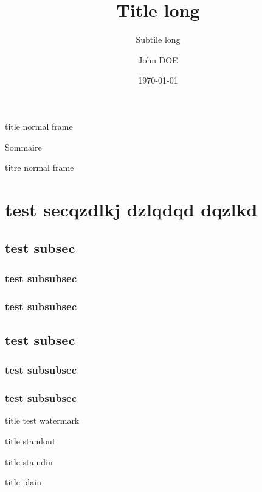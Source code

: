 \documentclass[notheorems, noamsthm, aspectratio=169, 10pt]{beamer}
\title[shorttitle]{Title long}
\subtitle[shortsubtitle]{Subtile long}
\date[shortdate]{\today}
\author[john.doe@mail.com]{John DOE\inst{1}}
\institute[shortinstitute]{\inst{1} An Awesome Company}
\begin{document}

\begin{frame}
   \titlepage
\end{frame}

\begin{frame}{title}
   normal frame
\end{frame}

{  
   \begin{frame}[toc]{Sommaire}
		\tableofcontents
	\end{frame}


	\begin{frame}{titre}
		normal frame
	\end{frame}
} 

\section{test secqzdlkj dzlqdqd dqzlkd} 
\subsection{test subsec}
\subsubsection{test subsubsec}
\subsubsection{test subsubsec}

\subsection{test subsec}
\subsubsection{test subsubsec}
\subsubsection{test subsubsec}


\begin{frame}[watermark]{title}  
   test watermark
\end{frame}

\begin{frame}[standout]{title}
   standout
\end{frame}

\begin{frame}[standin]{title}
   staindin
\end{frame}

\begin{frame}[plain]{title}
   plain
\end{frame}
\end{document}
